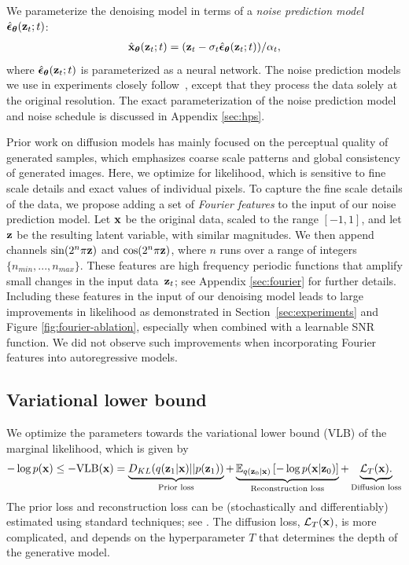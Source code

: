 \documentclass{article}
\newcommand{\lT}{\mathcal{L}_T(\rvx)}
\begin{document}
We parameterize the denoising model in terms of a \emph{noise prediction model} $\hat{{\boldsymbol{\epsilon}}}_{{\boldsymbol{\theta}}}({\mathbf{z}}_t; t)$:
\begin{align}
    \hat{{\mathbf{x}}}_{{\boldsymbol{\theta}}}({\mathbf{z}}_t; t) = ({\mathbf{z}}_t - \sigma_t \hat{{\boldsymbol{\epsilon}}}_{{\boldsymbol{\theta}}}({\mathbf{z}}_t; t))/\alpha_t,
\label{eq:noisepred}
\end{align}
where $\hat{{\boldsymbol{\epsilon}}}_{{\boldsymbol{\theta}}}({\mathbf{z}}_t; t)$ is parameterized as a neural network. The noise prediction models we use in experiments closely follow~\cite{ho2020denoising}, except that they process the data solely at the original resolution. The exact parameterization of the noise prediction model and noise schedule is discussed in Appendix \ref{sec:hps}.

Prior work on diffusion models has mainly focused on the perceptual quality of generated samples, which emphasizes coarse scale patterns and global consistency of generated images. Here, we optimize for likelihood, which is sensitive to fine scale details and exact values of individual pixels.  To capture the fine scale details of the data, we propose adding a set of \emph{Fourier features} to the input of our noise prediction model. Let ${\mathbf{x}}$ be the original data, scaled to the range $[-1,1]$, and let ${\mathbf{z}}$ be the resulting latent variable, with similar magnitudes. We then append channels $\sin(2^n\pi{\mathbf{z}})$ and $\cos(2^n\pi{\mathbf{z}})$, where $n$ runs over a range of integers $\{n_{min}, ..., n_{max}\}$. These features are high frequency periodic functions that amplify small changes in the input data~${\mathbf{z}}_t$; see Appendix \ref{sec:fourier} for further details.
Including these features in the input of our denoising model leads to large improvements in likelihood as demonstrated in Section~\ref{sec:experiments} and Figure \ref{fig:fourier-ablation}, especially when combined with a learnable SNR function. We did not observe such improvements when incorporating Fourier features into autoregressive models.

\subsection{Variational lower bound}
We optimize the parameters towards the variational lower bound (VLB) of the marginal likelihood, which is given by
\begin{align}
    - \log p(\rvx) \leq %
    - \text{VLB}(\rvx) =
    \underbrace{%
    D_{KL}(q(\rvz_1|\rvx)||p(\rvz_1))
    }_{\text{Prior loss}}
    + \underbrace{%
    \E_{q(\rvz_0|\rvx)}\left[ - \log p(\rvx|\rvz_0) \right]
    }_{\text{Reconstruction loss}}
    +
    \underbrace{
    \lT.
    }_{\text{Diffusion loss}}
    \label{eq:finite_elbo_1}
\end{align}
The prior loss and reconstruction loss can be (stochastically and differentiably) estimated using standard techniques; see \citep{kingma2013auto}. The diffusion loss, $\lT$, is more complicated, and depends on the hyperparameter $T$ that determines the depth of the generative model. 
\end{document}
